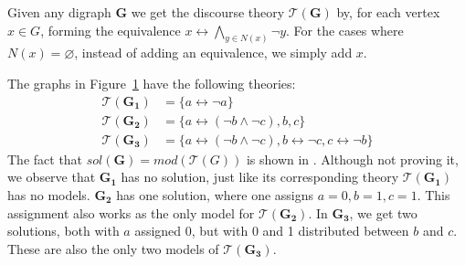 Given any digraph \textbf{G} we get the discourse theory $\mathcal{T}(\mathbf{G})$ by, for each vertex $x \in G$, forming the equivalence $x \leftrightarrow \bigwedge_{y \in N(x)} \neg y$.
For the cases where $N(x) = \varnothing$, instead of adding an equivalence, we simply add $x$.\par
\begin{figure}[!h]
  \centering
  \caption{}
  \label{ex:3graphs}
\end{figure}
  The graphs in Figure~\ref{ex:3graphs} have the following theories:
\begin{align}
  \mathcal{T}(\mathbf{G_1}) &= \big \{ a \leftrightarrow \neg a \big \} \\
  \mathcal{T}(\mathbf{G_2}) &= \big \{ a \leftrightarrow (\neg b \wedge \neg c), b, c \big \}\\
  \mathcal{T}(\mathbf{G_3}) &= \big \{ a \leftrightarrow (\neg b \wedge \neg c), b \leftrightarrow \neg c, c \leftrightarrow \neg b \big \}
\end{align}
The fact that $sol(\mathbf{G}) = mod(\mathcal{T}(G))$ is shown in \cite{apal-digraph}.
Although not proving it, we observe that $\mathbf{G_1}$ has no solution, just like its corresponding theory $\mathcal{T}(\mathbf{G_1})$ has no models.
$\mathbf{G_2}$ has one solution, where one assigns $a=0, b=1, c=1$.
This assignment also works as the only model for $\mathcal{T}(\mathbf{G_2})$.
In $\mathbf{G_3}$, we get two solutions, both with $a$ assigned 0, but with 0 and 1 distributed between $b$ and $c$.
These are also the only two models of $\mathcal{T}(\mathbf{G_3})$.

